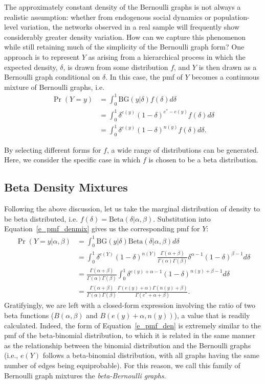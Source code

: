 \documentclass[11pt]{article}
\newcommand{\BG}{\ensuremath{\mathrm{BG}}\xspace}
\begin{document}
The approximately constant density of the Bernoulli graphs is not always a realistic assumption: whether from endogenous social dynamics or population-level variation, the networks observed in a real sample will frequently show considerably greater density variation.  How can we capture this phenomenon while still retaining much of the simplicity of the Bernoulli graph form?  One approach is to represent $Y$ as arising from a hierarchical process in which the expected density, $\delta$, is drawn from some distribution $f$, and $Y$ is then drawn as a Bernoulli graph conditional on $\delta$.  In this case, the pmf of $Y$ becomes a continuous mixture of Bernoulli graphs, i.e.
\begin{align}
\Pr(Y=y) &= \int_0^1 \BG(y|\delta) f(\delta) d\delta \nonumber \\
&= \int_0^1 \delta^{e(y)}(1-\delta)^{e^*-e(y)} f(\delta) d\delta \nonumber \\
&= \int_0^1 \delta^{e(y)}(1-\delta)^{n(y)} f(\delta) d\delta. \label{e_pmf_denmix}
\end{align}

By selecting different forms for $f$, a wide range of distributions can be generated.  Here, we consider the specific case in which $f$ is chosen to be a beta distribution.

\subsection{Beta Density Mixtures} \label{sec_mix_beta}

Following the above discussion, let us take the marginal distribution of density to be beta distributed, i.e. $f(\delta) = \mathrm{Beta}(\delta|\alpha,\beta)$.  Substitution into Equation~\ref{e_pmf_denmix} gives us the corresponding pmf for $Y$:
\begin{align}
\Pr(Y=y|\alpha,\beta) &= \int_0^1 \BG(y|\delta) \mathrm{Beta}(\delta|\alpha,\beta) d\delta \label{e_mixform_beta_den}\\
&= \int_0^1 \delta^{e(Y)}(1-\delta)^{n(Y)} \frac{\Gamma(\alpha+\beta)}{\Gamma(\alpha) \Gamma(\beta)} \delta^{\alpha-1} (1-\delta)^{\beta-1} d\delta \nonumber \\
&= \frac{\Gamma(\alpha+\beta)}{\Gamma(\alpha) \Gamma(\beta)} \int_0^1 \delta^{e(y)+\alpha-1} (1-\delta)^{n(y)+\beta-1} d\delta \nonumber \\
&= \frac{\Gamma(\alpha+\beta)}{\Gamma(\alpha) \Gamma(\beta)} \frac{\Gamma(e(y)+\alpha) \Gamma(n(y)+\beta)}{\Gamma(e^*+\alpha+\beta)}. \label{e_pmf_den}
\end{align}
Gratifyingly, we are left with a closed-form expression involving the ratio of two beta functions ($B(\alpha,\beta)$ and $B(e(y)+\alpha,n(y))$), a value that is readily calculated.  Indeed, the form of Equation~\ref{e_pmf_den} is extremely similar to the pmf of the beta-binomial distribution, to which it is related in the same manner as the relationship between the binomial distribution and the Bernoulli graphs (i.e., $e(Y)$ follows a beta-binomial distribution, with all graphs having the same number of edges being equiprobable).  For this reason, we call this family of Bernoulli graph mixtures the \emph{beta-Bernoulli graphs}.
\end{document}
